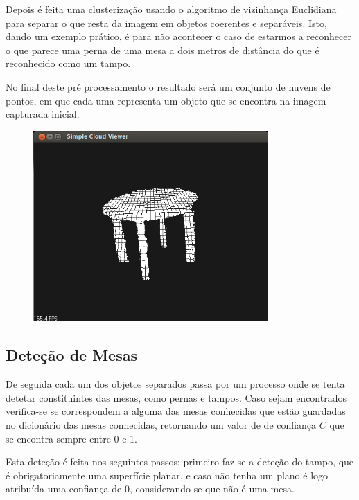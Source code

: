 Depois é feita uma clusterização usando o algoritmo de vizinhança Euclidiana para separar o que resta da imagem em objetos coerentes e separáveis. Isto, dando um exemplo prático, é para não acontecer o caso de estarmos a reconhecer o que parece uma perna de uma mesa a dois metros de distância do que é reconhecido como um tampo.

No final deste pré processamento o resultado será um conjunto de nuvens de pontos, em que cada uma representa um objeto que se encontra na imagem capturada inicial.

\begin{figure}[htb]
\begin{center}
	\includegraphics[width=0.80\textwidth]{figures/mesa1_1.png}
	\label{fig:exemplo_processado}
\end{center}
\end{figure}

\subsection{Deteção de Mesas}

De seguida cada um dos objetos separados passa por um processo onde se tenta 
detetar constituintes das mesas, como pernas e tampos. Caso sejam encontrados 
verifica-se se correspondem a alguma das mesas conhecidas que estão guardadas
no dicionário das mesas conhecidas, retornando um valor de de confiança \(C\) que se encontra sempre entre 0 e 1.

Esta deteção é feita nos seguintes passos: primeiro faz-se a deteção do tampo, que é obrigatoriamente uma superfície planar, e caso não tenha um plano é logo atribuída uma confiança de 0, considerando-se que não é uma mesa.

